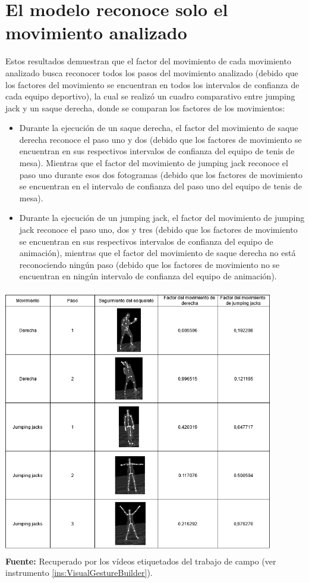 \section{El modelo reconoce solo el movimiento analizado} \label{res:recoMovAna}
Estos resultados demuestran que el factor del movimiento de cada movimiento analizado busca reconocer todos los pasos del movimiento analizado (debido que los factores del movimiento se encuentran en todos los intervalos de confianza de cada equipo deportivo), la cual se realiz\'o un cuadro comparativo entre jumping jack y un saque derecha, donde se comparan los factores de los movimientos:
\begin{itemize}
\item  Durante la ejecuci\'on de un saque derecha, el factor del movimiento de saque derecha reconoce el paso uno y dos (debido que los factores de movimiento se encuentran en sus respectivos intervalos de confianza del equipo de  tenis de mesa). Mientras que el factor del movimiento de jumping jack reconoce el paso uno durante esos dos fotogramas (debido que los factores de movimiento se encuentran en el intervalo de confianza del paso uno del equipo de tenis de mesa).
\item  Durante la ejecuci\'on de un jumping jack, el factor del movimiento de jumping jack reconoce el paso uno, dos y tres (debido que los factores de movimiento se encuentran en sus respectivos intervalos de confianza del equipo de animaci\'on), mientras que el factor del movimiento de saque derecha no est\'a reconociendo ning\'un paso (debido que los factores de movimiento no se encuentran en ning\'un intervalo de confianza del equipo de animaci\'on).
\end{itemize}
\begin{table}[H]
	\caption{Cuadro comparativo entre un jumping jack y saque derecha}
	\label{fig:comparativeMovements}
	\centering
	\includegraphics[width=445px,height=440px]{graphics/resultados/compFM.PNG} \\
	\textbf{Fuente:} Recuperado por los v\'ideos etiquetados del trabajo de campo (ver instrumento \ref{ins:VisualGestureBuilder}).
\end{table}
